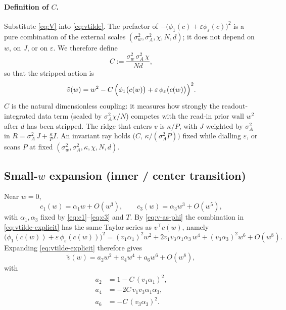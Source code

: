 \documentclass[11pt,a4paper]{article}
\begin{document}
\paragraph{Definition of $C$.}
Substitute \eqref{eq:V} into \eqref{eq:vtilde}.
The prefactor of
$-\bigl(\phi_1(c)+\varepsilon\phi_\varepsilon(c)\bigr)^2$
is a pure combination of the external scales
$(\sigma_w^2,\sigma_A^2,\chi,N,d)$; it does not depend on $w$, on $J$, or on
$\varepsilon$. We therefore define
\begin{equation}
  C
  :=
  \frac{\sigma_w^2\, \sigma_A^2\, \chi}{N d},
  \label{eq:C}
\end{equation}
so that the stripped action is
\begin{equation}
  \tilde v(w)
  =
  w^2
  -
  C\,
  \Bigl(
    \phi_1\bigl(c(w)\bigr)
    +
    \varepsilon\,
    \phi_\varepsilon\bigl(c(w)\bigr)
  \Bigr)^2.
  \label{eq:vtilde-explicit}
\end{equation}
$C$ is the natural dimensionless coupling: it measures how strongly the
readout-integrated data term (scaled by $\sigma_A^2\chi/N$) competes with the read-in
prior wall $w^2$ after $d$ has been stripped.
The ridge that enters $v$ is $\kappa/P$, with $J$ weighted by $\sigma_A^2$ in
$R=\sigma_A^2\, J+\tfrac{\kappa}{P}I$.
An invariant ray holds $\bigl(C,\,\kappa/(\sigma_A^2 P)\bigr)$ fixed while dialling $\varepsilon$,
or scans $P$ at fixed $(\sigma_w^2,\sigma_A^2,\kappa,\chi,N,d)$.

\subsection{Small-$w$ expansion (inner / center transition)}

Near $w=0$,
\begin{equation}
  c_1(w)=\alpha_1 w+O(w^3),
  \qquad
  c_3(w)=\alpha_3 w^3+O(w^5),
\end{equation}
with $\alpha_1,\alpha_3$ fixed by \eqref{eq:c1}--\eqref{eq:c3} and $T$.
By \eqref{eq:v-as-phi} the combination in \eqref{eq:vtilde-explicit} has the
same Taylor series as $v^\top c(w)$, namely
\begin{equation}
  \bigl(\phi_1(c(w))+\varepsilon\,\phi_\varepsilon(c(w))\bigr)^2
  =
  (v_1\alpha_1)^2 w^2
  +
  2 v_1 v_3 \alpha_1\alpha_3\, w^4
  +
  (v_3\alpha_3)^2 w^6
  +O(w^8).
\end{equation}
Expanding \eqref{eq:vtilde-explicit} therefore gives
\begin{equation}
  \tilde v(w)
  =
  a_2 w^2
  +
  a_4 w^4
  +
  a_6 w^6
  +O(w^8),
  \label{eq:GL}
\end{equation}
with
\begin{align}
  a_2
  &=
  1
  -
  C\,(v_1\alpha_1)^2,
  \label{eq:a2}\\
  a_4
  &=
  -
  2C\, v_1 v_3\alpha_1\alpha_3,
  \label{eq:a4}\\
  a_6
  &=
  -
  C\,(v_3\alpha_3)^2.
  \label{eq:a6}
\end{align}
\end{document}
